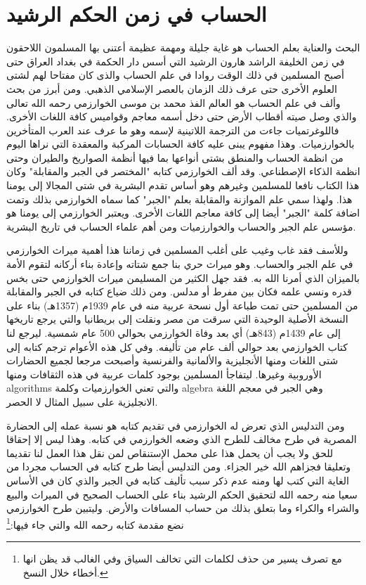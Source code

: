 \section{الحساب في زمن الحكم الرشيد}
البحث والعناية بعلم الحساب هو غاية جليلة ومهمة عظيمة أعتنى بها المسلمون اللاحقون في زمن الخليفة الراشد هارون الرشيد التي أسس دار الحكمة في بغداد العراق حتى أصبح المسلمين في ذلك الوقت روادا في علم الحساب والذى كان مفتاحا لهم لشتى العلوم الأخرى حتى عرف ذلك الزمان بالعصر الإسلامي الذهبي. ومن أبرز من بحث وألف في علم الحساب هو العالم الفذ محمد بن موسى الخوارزمي رحمه الله تعالى والذي وصل صيته أقطاب الأرض حتى دخل أسمه معاجم وقواميس كافة اللغات الأخرى. فاللوغرتميات جاءت من الترجمة اللاتينية لإسمه وهو ما عرف عند العرب المتأخرين بالخوارزميات. وهذا مفهوم يبنى عليه كافة الحسابات المركبة والمعقدة التي نراها اليوم من انظمة الحساب والمنطق بشتى أنواعها بما فيها أنظمة الصواريخ والطيران وحتى انظمة الذكاء الإصطناعي. وقد ألف الخوارزمي كتابه "المختصر في الجبر والمقابلة" وكان هذا الكتاب نافعا للمسلمين وغيرهم وهو أساس تقدم البشرية في شتى المجالا إلى يومنا هذا. ولهذا سمي علم الموازنة والمقابلة بعلم "الجبر" كما سماه الخوارزمي بذلك وتمت اضافة كلمة "الجبر" أيضا إلى كافة معاجم اللغات الأخرى. ويعتبر الخوارزمي إلى يومنا هو مؤسس علم الجبر والحساب والخوارزميات ومن أهم علماء الحساب في تاريخ البشرية.

وللأسف فقد غاب وغيب على أغلب المسلمين في زماننا هذا أهمية ميراث الخوارزمي في علم الجبر والحساب. وهو ميراث حري بنا جمع شتاته وإعادة بناء أركانه لتقوم الأمة بالميزان الذي أمرنا الله به. فقد جهل الكثير من المسليمن ميراث الخوارزمي حتى بخس قدره ونسي علمه فكان بين مفرط أو مدلس. ومن ذلك ضياع كتابه في الجبر والمقابلة من المسلمين حتى تمت طباعة أول نسحة عربية منه في عام 1939م (1357هـ) بناء على النسخة الأصلية الوحيدة التي سرقت من مصر ونقلت إلى بريطانيا والتي يرجع تاريخها إلى عام 1439م (843هـ) أي بعد وفاة الخوارزمي بحوالي 500 عام شمسية.
ليرجع لنا كتاب الخوارزمي بعد حوالي ألف عام من تأليفه.
وفي كل هذه الأعوام ترجم كتابه إلى شتى اللغات ومنها الأنجليزية والألمانية والفرنسية وأصبحت مرجعا لجميع الحضارات الأوروبية وغيرها.
ليتفاجأ المسلمين بوجود كلمات عربية في هذه الثقافات ومنها algorithms والتي تعني الخوارزميات وكلمة algebra وهي الجبر في معجم اللغة الانجليزية على سبيل المثال لا الحصر.

ومن التدليس الذي تعرض له الخوارزمي في تقديم كتابه هو نسبة عمله إلى الحضارة المصرية في طرح مخالف للطرح الذي وضعه الخوارزمي في كتابه. وهذا ليس إلا إحقاقا للحق ولا يجب أن يحمل هذا على محمل الإستنقاص لمن نقل هذا العمل لنا تقديما وتعليقا فجزاهم الله خير الجزاء. ومن التدليس أيضا طرح كتابه في الحساب مجردا من الغاية التي كتب لها ومنه عدم ذكر سبب تأليف كتابه في الجبر والذي كان في الأساس سعيا منه رحمه الله لتحقيق الحكم الرشيد بناء على الحساب الصحيح في الميراث والبيع والشراء والكراء وما بتعلق بذلك من حساب المسافات والأرض. وليتبين طرح الخوارزمي نضع مقدمة كتابه رحمه الله والتي جاء فيها:\footnote{مع تصرف يسير من حذف لكلمات التي تخالف السياق وفي الغالب قد يظن انها أخطاء خلال النسخ.}

